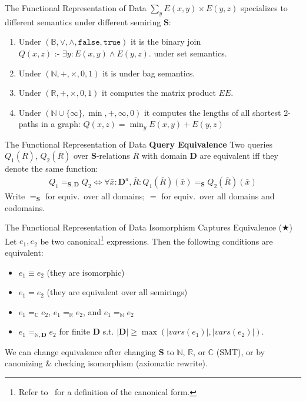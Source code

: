 \documentclass{beamer}
\newcommand{\C}{\mathbb C} %
\newcommand{\N}{\mathbb N} %
\newcommand{\R}{\mathbb R} %
\newcommand{\D}{\mathbf D} %
\newcommand{\SR}{\mathbf S} %
\newcommand{\dleq}{\mbox{ :- }}
\newcommand{\set}[1]{\{#1\}}                    %
\begin{document}
  \begin{frame}{The Functional Representation of Data}
    $\sum_y E(x, y) \times E(y, z)$ specializes to 
    different semantics under different semiring $\SR$:
    \begin{enumerate}
      \item Under $(\mathbb{B},\vee, \wedge, \texttt{false}, \texttt{true})$
          it is the binary join $Q(x, z) \dleq \exists y: E(x, y) \wedge E(y, z).$ 
          under set semantics. \pause
      \item Under $(\mathbb{N}, +, \times, 0, 1)$ it is under
          bag semantics. \pause
      \item Under $(\mathbb{R}, +, \times, 0, 1)$ it computes the matrix product $EE$. \pause
      \item Under $(\mathbb{N} \cup \set{\infty}, \min, +, \infty, 0)$ it computes the lengths
          of all shortest 2-paths in a graph:
          $Q(x, z) = \min_y E(x, y) + E(y, z)$
  \end{enumerate}
  \end{frame}

  \begin{frame}{The Functional Representation of Data}
    \textbf{Query Equivalence} Two queries
    $Q_1({\bar R})$, $Q_2({\bar R})$
    over $\SR$-relations ${\bar R}$ with domain $\mathbf{D}$
    are equivalent iff
    they denote the same function:
    \begin{align*}
    Q_1 =_{\SR,\D} Q_2 \iff
    \forall {\bar x}:\D^a, {\bar R} :
    Q_1({\bar R})({\bar x}) =_{\SR}
    Q_2({\bar R})({\bar x})
    \end{align*} \pause
    Write $=_{\SR}$ for equiv.~over all domains;
    $=$ for equiv.~over all domains and codomains.
  \end{frame}

  \begin{frame}{The Functional Representation of Data}
    \alert{Isomorphism Captures Equivalence} ($\bigstar$)~\cite{spores,semiring}
    Let $e_1, e_2$ be two canonical\footnote{Refer to~\cite{spores} for a definition of the canonical form.}
     expressions.
    Then the following conditions are equivalent:
    \begin{itemize}
    \item \label{item:1} $e_1 \equiv e_2$ (they are isomorphic)
    \item \label{item:2} $e_1 = e_2$ (they are equivalent over all semirings)
    \item \label{item:3} $e_1 =_\C e_2$, $e_1 =_\R e_2$, and $e_1 =_\N e_2$
    \item \label{item:6} $e_1 =_{\N, \D} e_2$ for finite $\D$
    s.t. $|\D| \geq \max(|vars(e_1)|, |vars(e_2)|)$.
    \end{itemize} \pause
    We can change equivalence after changing $\SR$ to $\N$, $\R$, or $\C$ (SMT),
    or by canonizing \& checking isomorphism (axiomatic rewrite).
  \end{frame}
\end{document}

